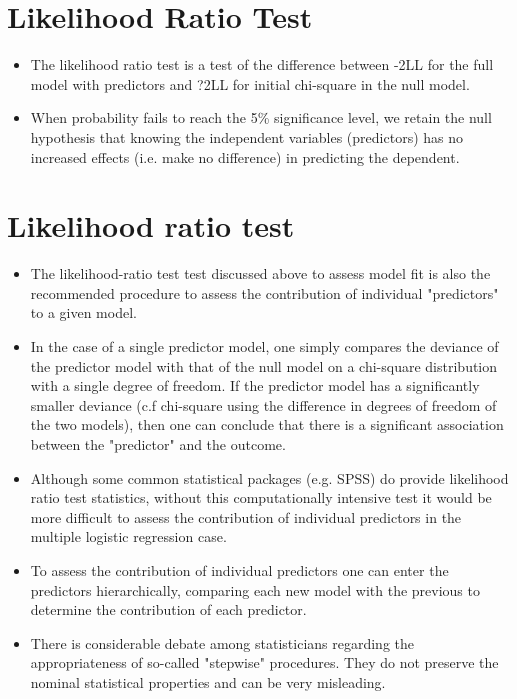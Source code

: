 ﻿\documentclass[a4paper,12pt]{article}
\begin{document}


\section{Likelihood Ratio Test}
\begin{itemize}
\item The likelihood ratio test is a test of the difference between -2LL for the full
model with predictors and ?2LL for initial chi-square in the null model.
\item When probability fails to reach the 5\% significance level, we retain the null hypothesis
that knowing the independent variables (predictors) has no increased effects (i.e. make no
difference) in predicting the dependent.
\end{itemize}



\section{Likelihood ratio test}
\begin{itemize}
\item The likelihood-ratio test test discussed above to assess model fit is also the recommended procedure to assess the contribution of individual "predictors" to a given model.

\item In the case of a single predictor model, one simply compares the deviance of the predictor model with that of the null model on a chi-square distribution with a single degree of freedom. If the predictor model has a significantly smaller deviance (c.f chi-square using the difference in degrees of freedom of the two models), then one can conclude that there is a significant association between the "predictor" and the outcome. 
\item Although some common statistical packages (e.g. SPSS) do provide likelihood ratio test statistics, without this computationally intensive test it would be more difficult to assess the contribution of individual predictors in the multiple logistic regression case. 
\item To assess the contribution of individual predictors one can enter the predictors hierarchically, comparing each new model with the previous to determine the contribution of each predictor.
\item There is considerable debate among statisticians regarding the appropriateness of so-called "stepwise" procedures. They do not preserve the nominal statistical properties and can be very misleading.
\end{itemize}
\end{document}
